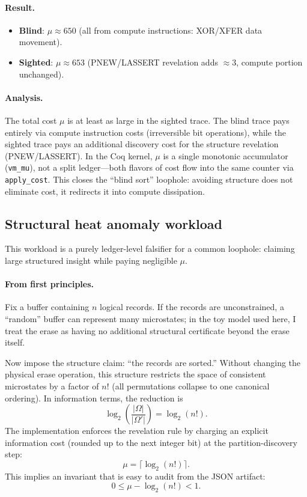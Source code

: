 \paragraph{Result.}
\begin{itemize}
    \item \textbf{Blind}: $\mu \approx 650$ (all from compute instructions: XOR/XFER data movement).
    \item \textbf{Sighted}: $\mu \approx 653$ (PNEW/LASSERT revelation adds $\approx 3$, compute portion unchanged).
\end{itemize}

\paragraph{Analysis.}
The total cost $\mu$ is at least as large in the sighted trace. The blind trace pays entirely via compute instruction costs (irreversible bit operations), while the sighted trace pays an additional discovery cost for the structure revelation (PNEW/LASSERT). In the Coq kernel, $\mu$ is a single monotonic accumulator (\texttt{vm\_mu}), not a split ledger---both flavors of cost flow into the same counter via \texttt{apply\_cost}. This closes the ``blind sort'' loophole: avoiding structure does not eliminate cost, it redirects it into compute dissipation.

\subsection{Structural heat anomaly workload}
This workload is a purely ledger-level falsifier for a common loophole: claiming large structured insight while paying negligible $\mu$.

\paragraph{From first principles.}
Fix a buffer containing $n$ logical records. If the records are unconstrained, a ``random'' buffer can represent many microstates; in the toy model used here, I treat the erase as having no additional structural certificate beyond the erase itself.

Now impose the structure claim: ``the records are sorted.'' Without changing the physical erase operation, this structure restricts the space of consistent microstates by a factor of $n!$ (all permutations collapse to one canonical ordering). In information terms, the reduction is
\[
\log_2\left(\frac{|\Omega|}{|\Omega'|}\right)=\log_2(n!).
\]
The implementation enforces the revelation rule by charging an explicit information cost (rounded up to the next integer bit) at the partition-discovery step:
\[
\mu = \lceil \log_2(n!) \rceil.
\]
This implies an invariant that is easy to audit from the JSON artifact:
\[
0 \le \mu-\log_2(n!) < 1.
\]

